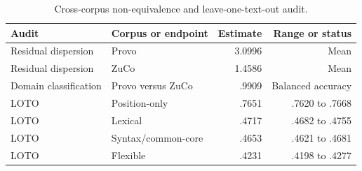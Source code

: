 \begin{table}[tbp]
\centering
\caption{Cross-corpus non-equivalence and leave-one-text-out audit.}
\label{tab:robustness}
\small
\begin{tabularx}{\linewidth}{lYrr}
\toprule
Audit & Corpus or endpoint & Estimate & Range or status \\
\midrule
Residual dispersion & Provo & 3.0996 & Mean \\
Residual dispersion & ZuCo & 1.4586 & Mean \\
Domain classification & Provo versus ZuCo & .9909 & Balanced accuracy \\
LOTO & Position-only & .7651 & .7620 to .7668 \\
LOTO & Lexical & .4717 & .4682 to .4755 \\
LOTO & Syntax/common-core & .4653 & .4621 to .4681 \\
LOTO & Flexible & .4231 & .4198 to .4277 \\
\bottomrule
\end{tabularx}
\end{table}

